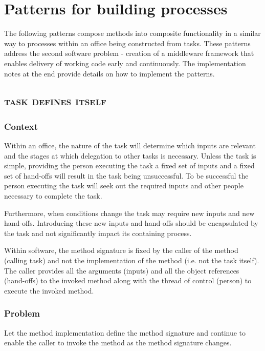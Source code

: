 \documentclass[prodmode]{style/acmlarge}
\begin{document}
\section{Patterns for building processes}

The following patterns compose methods into composite functionality in a similar
way to processes within an office being constructed from tasks.  These patterns
address the second software problem - creation of a middleware framework that
enables delivery of working code early and continuously.  The implementation
notes at the end provide details on how to implement the patterns.


\subsection{\textsc{\textbf{task defines itself}}}

\subsubsection*{Context} Within an office, the nature of the task will determine
which inputs are relevant and the stages at which delegation to other tasks is
necessary.  Unless the task is simple, providing the person executing the task a
fixed set of inputs and a fixed set of hand-offs will result in the task being
unsuccessful.  To be successful the person executing the task will seek out the
required inputs and other people necessary to complete the task.

Furthermore, when conditions change the task may require new inputs and new
hand-offs.  Introducing these new inputs and hand-offs should be encapsulated by
the task and not significantly impact its containing process.

Within software, the method signature is fixed by the caller of the method
(calling task) and not the implementation of the method (i.e. not the task
itself).  The caller provides all the arguments (inputs) and all the
object references (hand-offs) to the invoked method along with the thread of
control (person) to execute the invoked method.

\subsubsection*{\textbf{Problem}} Let the method implementation define the method
signature and continue to enable the caller to invoke the method as the method
signature changes.
\end{document}
